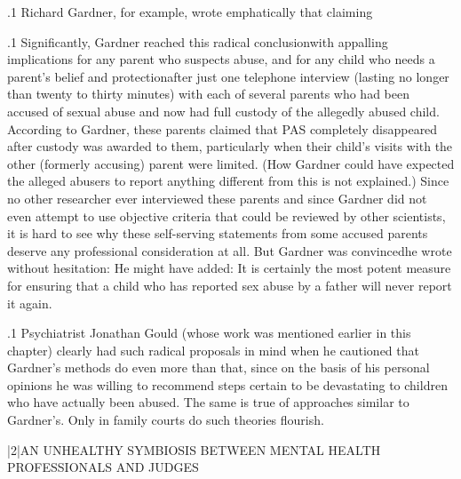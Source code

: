 \documentclass[11pt, twoside]{article}
\begin{document}
{\p.1{%
Richard Gardner, for example, wrote emphatically that  claiming 
}%

\p.1{%
Significantly, Gardner reached this radical conclusion\mdash{}with appalling implications for any parent who suspects abuse, and for any
child who needs a parent’s belief and protection\mdash{}after just one telephone interview (lasting no longer than twenty to thirty minutes) with
each of several parents who had been accused of sexual abuse and now
had full custody of the allegedly abused child. According to Gardner,
these parents claimed that PAS completely disappeared after custody
was awarded to them, particularly when their child’s visits with the other
(formerly accusing) parent were limited. (How Gardner could have expected the alleged abusers to report anything different from this is not
explained.) Since no other researcher ever interviewed these parents and
since Gardner did not even attempt to use objective criteria that could
be reviewed by other scientists, it is hard to see why these self-serving
statements from some accused parents deserve any professional consideration at all. But Gardner was convinced\mdash{}he wrote without hesitation:
 He
might have added: It is certainly the most potent measure for ensuring
that a child who has reported sex abuse by a father will never report it
again.
}%

\p.1{%
Psychiatrist Jonathan Gould (whose work was mentioned earlier in this chapter) clearly
had such radical proposals in mind when he cautioned that  Gardner’s methods do even more than that, since on the basis
of his personal opinions he was willing to recommend steps certain to
be devastating to children who have actually been abused. The same is
true of approaches similar to Gardner’s. Only in family courts do such
theories flourish.
}%


\s|2|{AN UNHEALTHY SYMBIOSIS BETWEEN MENTAL HEALTH\\PROFESSIONALS AND JUDGES}

}
\end{document}
